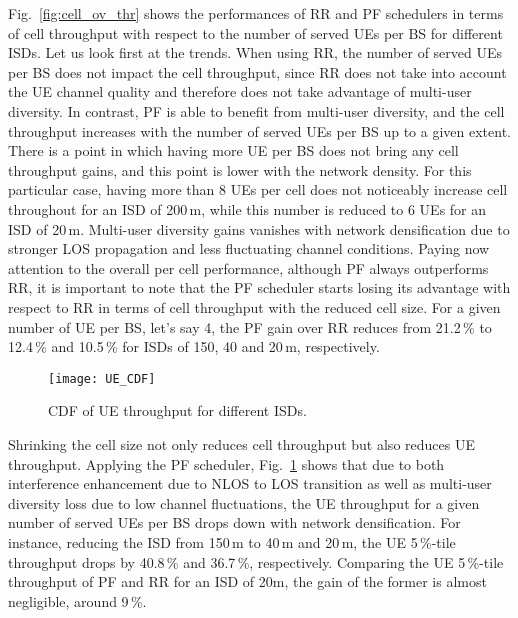 \documentclass{IEEEtran}
\begin{document}
Fig.~\ref{fig:cell_ov_thr} shows the performances of \ac{RR} and \ac{PF} schedulers in terms of cell throughput with respect to the number of served \acp{UE} per \ac{BS} for different \acp{ISD}.
Let us look first at the trends.
When using \ac{RR},
the number of served \acp{UE} per \ac{BS} does not impact the cell throughput,
since \ac{RR} does not take into account the \ac{UE} channel quality and therefore does not take advantage of multi-user diversity.
In contrast, \ac{PF} is able to benefit from multi-user diversity,
and the cell throughput increases with the number of served \acp{UE} per \ac{BS} up to a given extent.
There is a point in which having more \ac{UE} per \ac{BS} does not bring any cell throughput gains,
and this point is lower with the network density.
For this particular case,
having more than 8 \acp{UE} per cell does not noticeably increase cell throughout for an \ac{ISD} of 200\,m,
while this number is reduced to 6 \acp{UE} for an ISD of 20\,m.
Multi-user diversity gains vanishes with network densification due to stronger \ac{LOS} propagation and less fluctuating channel conditions.
Paying now attention to the overall per cell performance,
although \ac{PF} always outperforms \ac{RR},
it is important to note that the \ac{PF} scheduler starts losing its advantage with respect to \ac{RR} in terms of cell throughput with the reduced cell size.
For a given number of \ac{UE} per \ac{BS}, let's say 4,
the \ac{PF} gain over \ac{RR} reduces from 21.2\,\% to 12.4\,\% and 10.5\,\% for ISDs of 150, 40 and 20\,m, respectively.

\begin{figure}[t]
	\centering
	\texttt{[image: UE\_CDF]}
	\caption{CDF of UE throughput for different ISDs.}
	\label{fig:ue_cdf}
\end{figure}

Shrinking the cell size not only reduces cell throughput but also reduces \ac{UE} throughput.
Applying the \ac{PF} scheduler,
Fig.~\ref{fig:ue_cdf} shows that due to both interference enhancement due to NLOS to LOS transition as well as multi-user diversity loss due to low channel fluctuations,
the \ac{UE} throughput for a given number of served \acp{UE} per \ac{BS} drops down with network densification. 
For instance, reducing the \ac{ISD} from 150\,m to 40\,m and 20\,m, the \ac{UE} 5\,\%-tile throughput drops by 40.8\,\% and 36.7\,\%, respectively. 
Comparing the \ac{UE} 5\,\%-tile throughput of \ac{PF} and \ac{RR} for an ISD of 20m,
the gain of the former is almost negligible, around 9\,\%.
\end{document}
